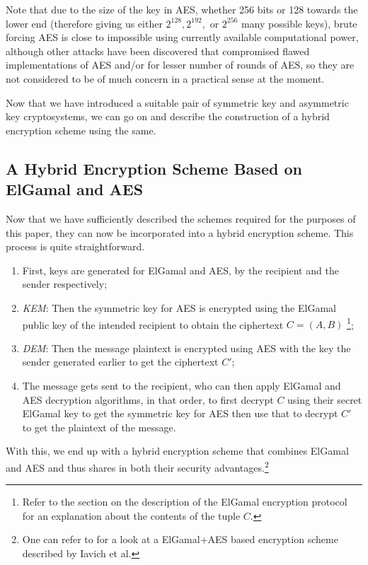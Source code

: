 Note that due to the size of the key in AES, whether 256 bits or 128 towards the lower end (therefore giving us either $2^{128}, 2^{192},$ or $2^{256}$ many possible keys), brute forcing AES is close to impossible using currently available computational power, although other attacks have been discovered that compromised flawed implementations of AES and/or for lesser number of rounds of AES, so they are not considered to be of much concern in a practical sense at the moment.

Now that we have introduced a suitable pair of symmetric key and asymmetric key cryptosystems, we can go on and describe the construction of a hybrid encryption scheme using the same.

\subsection{A Hybrid Encryption Scheme Based on ElGamal and AES}

Now that we have sufficiently described the schemes required for the purposes of this paper, they can now be incorporated into a hybrid encryption scheme. 
This process is quite straightforward.

\begin{enumerate}
    \item First, keys are generated for ElGamal and AES, by the recipient and the sender respectively;
    \item\emph{KEM}: Then the symmetric key for AES  is encrypted using the ElGamal public key of the intended recipient to obtain the ciphertext $C=(A,B)$\textsuperscript{   }\footnote{Refer to the section on the description of the ElGamal encryption protocol for an explanation about the contents of the tuple $C$.};
    \item\emph{DEM}: Then the message plaintext is encrypted using AES with the key the sender generated earlier to get the ciphertext $C'$;
    \item The message gets sent to the recipient, who can then apply ElGamal and AES decryption algorithms, in that order, to first decrypt $C$ using their secret ElGamal key to get the symmetric key for AES then use that to decrypt $C'$ to get the plaintext of the message.
\end{enumerate}
With this, we end up with a hybrid encryption scheme that combines ElGamal and AES and thus shares in both their security advantages.\footnote{One can refer to \cite{Iavich_Gnatyuk_Jintcharadze_Polishchuk_Odarchenko_2018} for a look at a ElGamal+AES based encryption scheme described by Iavich et al.}
